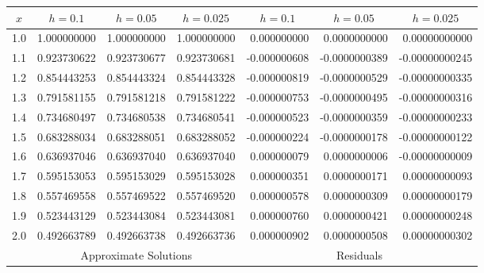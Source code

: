 \documentclass[dvips]{book}
\renewcommand{\exer}[1]{\par\medskip\;\noindent{\color{red}\bf #1.}}
\numberwithin{example}{section}
\numberwithin{equation}{section}
\numberwithin{theorem}{section}
\numberwithin{table}{section}
\numberwithin{figure}{section}
\begin{document}
\exer{3.3.10}
{\small
\begin{tabular}{|c|r|r|r|r|r|r|}\hline
\multicolumn{1}{|c|}{$x$}&
\multicolumn{1}{|c|}{$h=0.1$}&
\multicolumn{1}{|c|}{$h=0.05$}&
\multicolumn{1}{|c|}{$h=0.025$}&
\multicolumn{1}{|c|}{$h=0.1$}&
\multicolumn{1}{|c|}{$h=0.05$}&
\multicolumn{1}{|c|}{$h=0.025$}\\ \hline
1.0 & 1.000000000 & 1.000000000 & 1.000000000 & 0.000000000 &  0.0000000000 &   0.00000000000\\
1.1 & 0.923730622 & 0.923730677 & 0.923730681 &-0.000000608 & -0.0000000389 &  -0.00000000245 \\
1.2 & 0.854443253 & 0.854443324 & 0.854443328 &-0.000000819 & -0.0000000529 &  -0.00000000335 \\
1.3 & 0.791581155 & 0.791581218 & 0.791581222 &-0.000000753 & -0.0000000495 &  -0.00000000316 \\
1.4 & 0.734680497 & 0.734680538 & 0.734680541 &-0.000000523 & -0.0000000359 &  -0.00000000233 \\
1.5 & 0.683288034 & 0.683288051 & 0.683288052 &-0.000000224 & -0.0000000178 &  -0.00000000122 \\
1.6 & 0.636937046 & 0.636937040 & 0.636937040 & 0.000000079 &  0.0000000006 &  -0.00000000009 \\
1.7 & 0.595153053 & 0.595153029 & 0.595153028 & 0.000000351 &  0.0000000171 &   0.00000000093 \\
1.8 & 0.557469558 & 0.557469522 & 0.557469520 & 0.000000578 &  0.0000000309 &   0.00000000179 \\
1.9 & 0.523443129 & 0.523443084 & 0.523443081 & 0.000000760 &  0.0000000421 &   0.00000000248 \\
2.0 & 0.492663789 & 0.492663738 & 0.492663736 & 0.000000902 &  0.0000000508 &   0.00000000302 \\
\hline
&\multicolumn{3}{c|}{Approximate Solutions}&
\multicolumn{3}{c|}{Residuals}\\\hline
\end{tabular}}
\end{document}
